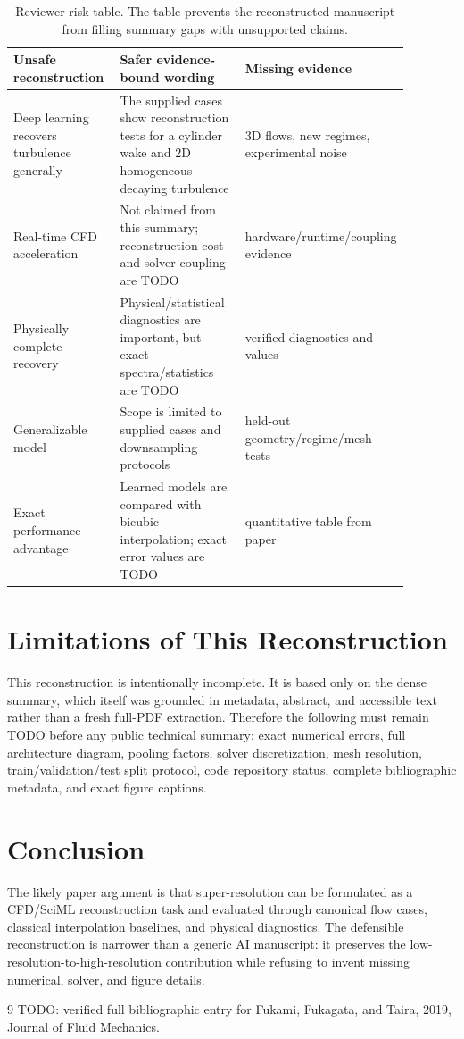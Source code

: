 \documentclass[11pt]{article}
\begin{document}
\begin{table}[h]
\centering
\small
\begin{tabular}{p{0.28\linewidth}p{0.34\linewidth}p{0.26\linewidth}}
\toprule
Unsafe reconstruction & Safer evidence-bound wording & Missing evidence \\
\midrule
Deep learning recovers turbulence generally & The supplied cases show reconstruction tests for a cylinder wake and 2D homogeneous decaying turbulence & 3D flows, new regimes, experimental noise \\
Real-time CFD acceleration & Not claimed from this summary; reconstruction cost and solver coupling are TODO & hardware/runtime/coupling evidence \\
Physically complete recovery & Physical/statistical diagnostics are important, but exact spectra/statistics are TODO & verified diagnostics and values \\
Generalizable model & Scope is limited to supplied cases and downsampling protocols & held-out geometry/regime/mesh tests \\
Exact performance advantage & Learned models are compared with bicubic interpolation; exact error values are TODO & quantitative table from paper \\
\bottomrule
\end{tabular}
\caption{Reviewer-risk table. The table prevents the reconstructed manuscript from filling summary gaps with unsupported claims.}
\end{table}

\section{Limitations of This Reconstruction}
This reconstruction is intentionally incomplete. It is based only on the dense summary, which itself was grounded in metadata, abstract, and accessible text rather than a fresh full-PDF extraction. Therefore the following must remain TODO before any public technical summary: exact numerical errors, full architecture diagram, pooling factors, solver discretization, mesh resolution, train/validation/test split protocol, code repository status, complete bibliographic metadata, and exact figure captions.

\section{Conclusion}
The likely paper argument is that super-resolution can be formulated as a CFD/SciML reconstruction task and evaluated through canonical flow cases, classical interpolation baselines, and physical diagnostics. The defensible reconstruction is narrower than a generic AI manuscript: it preserves the low-resolution-to-high-resolution contribution while refusing to invent missing numerical, solver, and figure details.

\begin{thebibliography}{9}
 TODO: verified full bibliographic entry for Fukami, Fukagata, and Taira, 2019, Journal of Fluid Mechanics.
\end{thebibliography}
\end{document}
